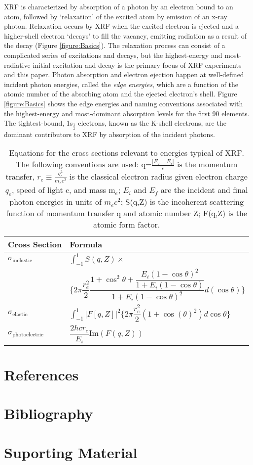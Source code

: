 \documentclass[%
  aip,12pt,tightenlines,
  amsthm,
 amsmath,amssymb,
 reprint,%
]{revtex4-1}
\newcommand{\e}[0]{\\ \hline}
\newcommand{\fRef}[1]{Figure \ref{figure:#1}}
\newcommand{\tLabel}[1]{\label{table:#1}}
\newcommand{\pcaption}[1]{\caption{\noindent#1}}
\newcommand{\firstp}[0]{\noindent}
\newcommand{\pStartF}[0]{ }
\begin{document}
\firstp XRF is characterized by absorption of a photon by an electron bound to an atom, followed by `relaxation' of the excited atom by emission of an x-ray photon.\cite{jitschin_progress_1990} Relaxation occurs by XRF when the excited electron is ejected and a higher-shell electron `decays' to fill the vacancy, emitting radiation as a result of the decay (\fRef{Basics}). The relaxation process can consist of a complicated series of excitations and decays,\cite{santra_concepts_2009} but the highest-energy and most-radiative initial excitation and decay is the primary focus of XRF experiments and this paper. Photon absorption and electron ejection happen at well-defined incident photon energies, called the \emph{edge energies}, which are a function of the atomic number of the absorbing atom and the ejected electron's shell.\cite{ueda_high-resolution_2003,de_groot_high-resolution_2001} \fRef{Basics} shows the edge energies and naming conventions associated with the highest-energy and most-dominant\cite{chantler_detailed_2000} absorption levels for the first 90 elements. The tightest-bound, 1s$_{\frac{1}{2}}$ electrons, known as the K-shell electrons, are the dominant contributors to XRF by absorption of the incident photons.\cite{chantler_detailed_2000}

\begin{table}
\begin{ruledtabular}
\begin{tabular}{ l | l  }
  Cross Section &  Formula  \e
  $\sigma_{\text{inelastic}}$ & $\int_{-1}^{1}S(q,Z) \times$ \\ &
  $\{ 2 \pi \dfrac{r_e^2}{2} \dfrac{1+\cos^2{\theta}+\dfrac{E_i (1-\cos\theta)^2}{1+E_i(1-\cos\theta)}}{1+E_i(1-\cos\theta)^2}  d(\cos\theta) \}$ \e
  $\sigma_{\text{elastic}}$ & $ \int_{-1}^{1} |F[q,Z]|^2 \{ 2 \pi \dfrac{r_e^2}{2} (1 + \cos(\theta)^2)  d\cos\theta \}$ \e
  $\sigma_{\text{photoelectric}}$ & $\dfrac{2 h c r_e}{E_i} \text{Im}(F(q,Z))$  
\end{tabular}
\end{ruledtabular}
\pcaption{\tLabel{Scattering}\pStartF Equations for the cross sections relevant to energies typical of XRF. The following conventions are used: q=$\frac{|E_f-E_i|}{c}$ is the momentum transfer, $r_e\equiv\frac{q_e^2}{m_e c^2}$ is the classical electron radius given electron charge $q_e$, speed of light c, and mass m$_e$; $E_i$ and $E_f$ are the incident and final photon energies in units of $m_e c^2$; S(q,Z) is the incoherent scattering function of momentum transfer q and atomic number Z;\cite{hubbell_pair_1980} F(q,Z) is the atomic form factor.\cite{waasmaier_new_1995,hubbell_atomic_1975}}
\end{table}



\section{References}


\section{Bibliography}



 

\section{Suporting Material}
\end{document}
